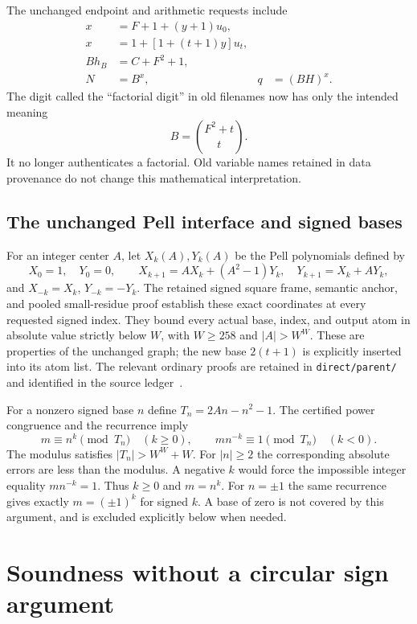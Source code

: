 \documentclass[11pt]{article}
\theoremstyle{definition}
\begin{document}
The unchanged endpoint and arithmetic requests include
\begin{align}
 x&=F+1+(y+1)u_0,\label{eq:first-end}\\
 x&=1+[1+(t+1)y]u_t,\label{eq:last-end}\\
 B h_B&=C+F^2+1,\label{eq:index-row}\\
 N&=B^x,&q&=(BH)^x.\label{eq:two-powers}
\end{align}
The digit called the ``factorial digit'' in old filenames now has only
the intended meaning
\begin{equation}\label{eq:new-binomial}
                     B=\binom{F^2+t}{t}.
\end{equation}
It no longer authenticates a factorial. Old variable names retained in
data provenance do not change this mathematical interpretation.

\subsection{The unchanged Pell interface and signed bases}

For an integer center $A$, let $X_k(A),Y_k(A)$ be the Pell polynomials
defined by
\[
 X_0=1,\quad Y_0=0,\qquad
 X_{k+1}=AX_k+(A^2-1)Y_k,\quad Y_{k+1}=X_k+AY_k,
\]
and $X_{-k}=X_k$, $Y_{-k}=-Y_k$. The retained signed square frame,
semantic anchor, and pooled small-residue proof establish these exact
coordinates at every requested signed index. They bound every actual
base, index, and output atom in absolute value strictly below $W$, with
$W\ge258$ and $|A|>W^W$. These are properties of the unchanged graph;
the new base $2(t+1)$ is explicitly inserted into its atom list.
The relevant ordinary proofs are retained in \nolinkurl{direct/parent/}
and identified in the source ledger~\cite{common,centered}.

For a nonzero signed base $n$ define $T_n=2An-n^2-1$. The certified
power congruence and the recurrence imply
\[
 m\equiv n^k\pmod{T_n}\quad(k\ge0),\qquad
 mn^{-k}\equiv1\pmod{T_n}\quad(k<0).
\]
The modulus satisfies $|T_n|>W^W+W$. For $|n|\ge2$ the corresponding
absolute errors are less than the modulus. A negative $k$ would force
the impossible integer equality $mn^{-k}=1$. Thus $k\ge0$ and
$m=n^k$. For $n=\pm1$ the same recurrence gives exactly
$m=(\pm1)^k$ for signed $k$. A base of zero is not covered by this
argument, and is excluded explicitly below when needed.

\section{Soundness without a circular sign argument}\label{sec:soundness}
\end{document}
